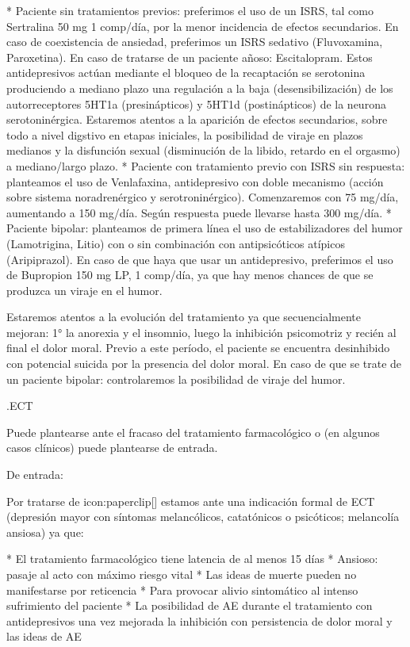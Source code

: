 * Paciente sin tratamientos previos: preferimos el uso de un ISRS, tal como Sertralina 50 mg 1 comp/día, por la menor incidencia de efectos secundarios. En caso de coexistencia de ansiedad, preferimos un ISRS sedativo (Fluvoxamina, Paroxetina). En caso de tratarse de un paciente añoso: Escitalopram. Estos antidepresivos actúan mediante el bloqueo de la recaptación se serotonina produciendo a mediano plazo una regulación a la baja (desensibilización) de los autorreceptores 5HT1a (presinápticos) y 5HT1d (postinápticos) de la neurona serotoninérgica. Estaremos atentos a la aparición de efectos secundarios, sobre todo a nivel digstivo en etapas iniciales, la posibilidad de viraje en plazos medianos y la disfunción sexual (disminución de la libido, retardo en el orgasmo) a mediano/largo plazo.
* Paciente con tratamiento previo con ISRS sin respuesta: planteamos el uso de Venlafaxina, antidepresivo con doble mecanismo (acción sobre sistema noradrenérgico y serotroninérgico). Comenzaremos con 75 mg/día, aumentando a 150 mg/día. Según respuesta puede llevarse hasta 300 mg/día.
* Paciente bipolar: planteamos de primera línea el uso de estabilizadores del humor (Lamotrigina, Litio) con o sin combinación con antipsicóticos atípicos (Aripiprazol). En caso de que haya que usar un antidepresivo, preferimos el uso de Bupropion 150 mg LP, 1 comp/día, ya que hay menos chances de que se produzca un viraje en el humor.

Estaremos atentos a la evolución del tratamiento ya que secuencialmente mejoran: 1° la anorexia y el insomnio, luego la inhibición psicomotriz y recién al final el dolor moral. Previo a este período, el paciente se encuentra desinhibido con potencial suicida por la presencia del dolor moral. En caso de que se trate de un paciente bipolar: controlaremos la posibilidad de viraje del humor.

.ECT

Puede plantearse ante el fracaso del tratamiento farmacológico o (en algunos casos clínicos) puede plantearse de entrada.

De entrada:

Por tratarse de icon:paperclip[] estamos ante una indicación formal de ECT (depresión mayor con síntomas melancólicos, catatónicos o psicóticos; melancolía ansiosa) ya que:

* El tratamiento farmacológico tiene latencia de al menos 15 días
* Ansioso: pasaje al acto con máximo riesgo vital
* Las ideas de muerte pueden no manifestarse por reticencia
* Para provocar alivio sintomático al intenso sufrimiento del paciente
* La posibilidad de AE durante el tratamiento con antidepresivos una vez mejorada la inhibición con persistencia de dolor moral y las ideas de AE

